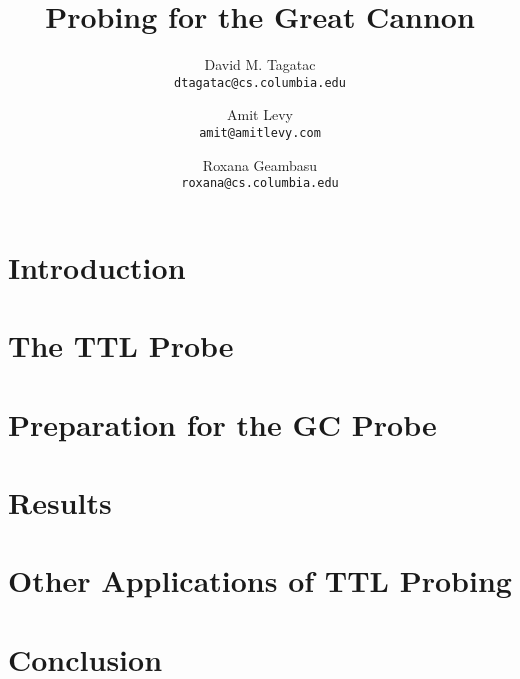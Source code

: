 \documentclass[10pt,twocolumn]{article}
\begin{document}
\title{\bf Probing for the Great Cannon}
\author{
	David M. Tagatac\\
	\texttt{dtagatac@cs.columbia.edu}
	\and
	Amit Levy\\
	\texttt{amit@amitlevy.com}
	\and
	Roxana Geambasu\\
	\texttt{roxana@cs.columbia.edu}
}
\date{}
\maketitle
\thispagestyle{empty}

%

\section{Introduction}


\section{The TTL Probe}


\section{Preparation for the GC Probe}


\section{Results}


\section{Other Applications of TTL Probing}


\section{Conclusion}


{\footnotesize 
}
\end{document}
